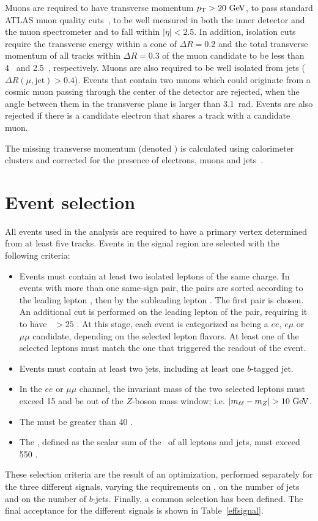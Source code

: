 Muons are required to have transverse momentum $\pt>20 \GeV$, to pass standard ATLAS muon quality
cuts~\cite{ATLAS-CONF-2011-063}, to be well measured in both the inner detector and the muon 
spectrometer and to fall within $|\eta|<2.5$. In addition, isolation cuts require the transverse energy 
within a cone of $\Delta R = 0.2$ and the total transverse momentum of all tracks within $\Delta R = 0.3$
of the muon candidate to be less than 4~\GeV{} and 2.5~\GeV{}, respectively. 
Muons are also required to be well isolated from jets ($\Delta R(\mu,\mathrm{jet})>0.4$).
Events that contain two muons which could originate from a cosmic muon passing
through the center of the detector are rejected, when the angle between them in the transverse plane
is larger than 3.1~rad. Events are also rejected if there is a candidate electron that shares a track
with a candidate muon.

The missing transverse momentum (denoted \met{}) is calculated using calorimeter clusters and corrected
for the presence of electrons, muons and jets~\cite{Aad:2012re}.

\section{Event selection}\label{sect:selection}
All events used in the analysis are required to have a primary vertex
determined from at least five tracks.
Events in the signal region are selected with the following criteria:
\begin{itemize}
\item Events must contain at least two isolated leptons of the same charge. In events with more than one
  same-sign pair, the pairs are sorted according to the leading lepton
  \pT, then by the subleading lepton \pT. The first pair is chosen. An additional cut
  is performed on the leading lepton of the pair, requiring it to have \pT\ $>25$ \GeV{}. At this
  stage, each event is categorized as being a $ee$, $e\mu$ or $\mu\mu$ candidate, depending on the
  selected lepton flavors. At least one of the selected leptons must match the one that triggered
  the readout of the event.
\item Events must contain at least two jets, including at least one $b$-tagged jet.
\item In the $ee$ or $\mu\mu$ channel, the invariant mass of the two selected leptons must exceed 15 \GeV{} and be out of the $Z$-boson mass window; i.e. $|m_{\ell\ell} - m_Z| > 10 \GeV$.
\item The \met{} must be greater than 40 \GeV{}.
\item The \HT{}, defined as the scalar sum of the \pt\  of all leptons and jets, must exceed 550 \GeV{}.
\end{itemize}
These selection criteria are the result of an optimization, performed separately for the three different
signals, varying the requirements on \HT{}, on the number of jets and on the number of $b$-jets.
Finally, a common selection has been defined. The final acceptance for the different
signals is shown in Table~\ref{effsignal}.

